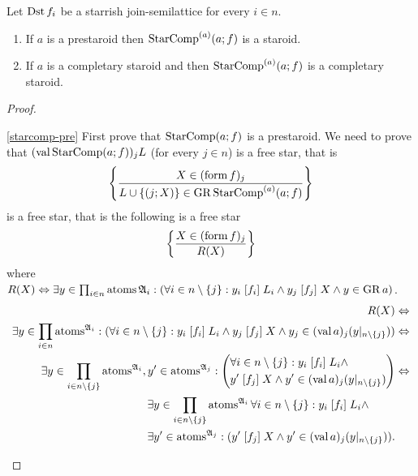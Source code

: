 \begin{thm}
\label{starcomp-is}Let $\operatorname{Dst} f_{i}$ be a starrish join-semilattice
for every $i\in n$.
\begin{enumerate}
\item \label{starcomp-pre}If $a$ is a prestaroid then $\operatorname{StarComp}^{(a)}(a;f)$
is a staroid.
\item \label{starcomp-compl}If $a$ is a completary staroid and then $\operatorname{StarComp}^{(a)}(a;f)$
is a completary staroid.
\end{enumerate}
\end{thm}
\begin{proof}
~
\begin{widedisorder}
\item [{\ref{starcomp-pre}}] First prove that $\operatorname{StarComp}(a;f)$ is a prestaroid.
We need to prove that $(\operatorname{val}\operatorname{StarComp}(a;f))_{j}L$ (for every $j\in n$)
is a free star, that is
\[
\left\{ \frac{X\in(\operatorname{form} f)_{j}}{L\cup\{(j;X)\}\in\operatorname{GR}\operatorname{StarComp}^{(a)}(a;f)}\right\}
\]
is a free star, that is the following is a free star
\[
\left\{ \frac{X\in(\operatorname{form} f)_{j}}{R(X)}\right\}
\]
where $R(X)\Leftrightarrow\exists y\in\prod_{i\in n}\operatorname{atoms}\mathfrak{A}_{i}:\left(\forall i\in n\setminus\{j\}:y_{i}\mathrel{\left[f_{i}\right]}L_{i}\wedge y_{j}\mathrel{\left[f_{j}\right]}X\wedge y\in\operatorname{GR} a\right)$.
\begin{align*}
R(X) & \Leftrightarrow\\
\exists y\in\prod_{i\in n}\operatorname{atoms}^{\mathfrak{A}_{i}}:(\forall i\in n\setminus\{j\}:y_{i}\mathrel{\left[f_{i}\right]}L_{i}\land y_{j}\mathrel{\left[f_{j}\right]}X\land y_{j}\in(\operatorname{val} a)_{j}(y|_{n\setminus\{j\}})) & \Leftrightarrow\\
\exists y\in\prod_{i\in n\setminus\{j\}}\operatorname{atoms}^{\mathfrak{A}_{i}},y'\in\operatorname{atoms}^{\mathfrak{A}_{j}}:\left(\begin{aligned} & \forall i\in n\setminus\{j\}:y_{i}\mathrel{\left[f_{i}\right]}L_{i}\land\\
 & y'\mathrel{\left[f_{j}\right]}X\land y'\in(\operatorname{val} a)_{j}(y|_{n\setminus\{j\}})
\end{aligned}
\right) & \Leftrightarrow\\
\begin{aligned} & \exists y\in\prod_{i\in n\setminus\{j\}}\operatorname{atoms}^{\mathfrak{A}_{i}}\forall i\in n\setminus\{j\}:y_{i}\mathrel{\left[f_{i}\right]}L_{i}\land\\
 & \exists y'\in\operatorname{atoms}^{\mathfrak{A}_{j}}:(y'\mathrel{\left[f_{j}\right]}X\land y'\in(\operatorname{val} a)_{j}(y|_{n\setminus\{j\}})).
\end{aligned}
\end{align*}




\end{widedisorder}
\end{proof}
